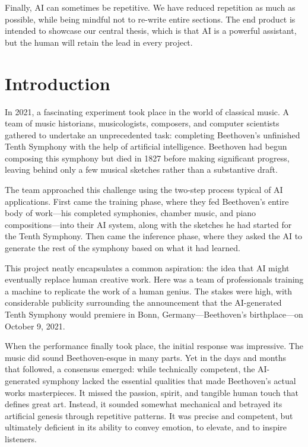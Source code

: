 \documentclass[
  Letterpaper,
]{scrbook}
\begin{document}
Finally, AI can sometimes be repetitive. We have reduced repetition as
much as possible, while being mindful not to re-write entire sections.
The end product is intended to showcase our central thesis, which is
that AI is a powerful assistant, but the human will retain the lead in
every project.


\chapter*{Introduction}\label{introduction}


In 2021, a fascinating experiment took place in the world of classical
music. A team of music historians, musicologists, composers, and
computer scientists gathered to undertake an unprecedented task:
completing Beethoven's unfinished Tenth Symphony with the help of
artificial intelligence. Beethoven had begun composing this symphony but
died in 1827 before making significant progress, leaving behind only a
few musical sketches rather than a substantive draft.

The team approached this challenge using the two-step process typical of
AI applications. First came the training phase, where they fed
Beethoven's entire body of work---his completed symphonies, chamber
music, and piano compositions---into their AI system, along with the
sketches he had started for the Tenth Symphony. Then came the inference
phase, where they asked the AI to generate the rest of the symphony
based on what it had learned.

This project neatly encapsulates a common aspiration: the idea that AI
might eventually replace human creative work. Here was a team of
professionals training a machine to replicate the work of a human
genius. The stakes were high, with considerable publicity surrounding
the announcement that the AI-generated Tenth Symphony would premiere in
Bonn, Germany---Beethoven's birthplace---on October 9, 2021.

When the performance finally took place, the initial response was
impressive. The music did sound Beethoven-esque in many parts. Yet in
the days and months that followed, a consensus emerged: while
technically competent, the AI-generated symphony lacked the essential
qualities that made Beethoven's actual works masterpieces. It missed the
passion, spirit, and tangible human touch that defines great art.
Instead, it sounded somewhat mechanical and betrayed its artificial
genesis through repetitive patterns. It was precise and competent, but
ultimately deficient in its ability to convey emotion, to elevate, and
to inspire listeners.
\end{document}
